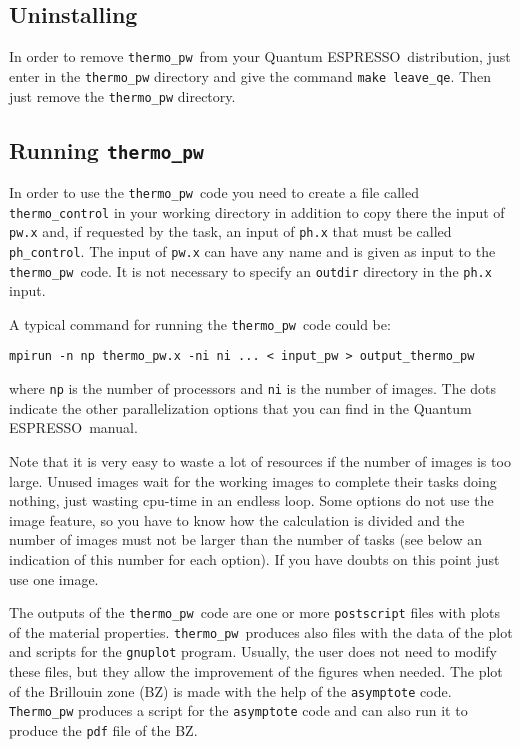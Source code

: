 \documentclass[12pt,a4paper]{article}
\def\qe{{\sc Quantum ESPRESSO}}
\def\thermo{\texttt{thermo\_pw}}
\begin{document}
\subsection{\color{web-blue}Uninstalling}

In order to remove \thermo\ from your \qe\ distribution, just enter in the
\texttt{thermo\_pw} directory and give the command \texttt{make leave\_qe}.
Then just remove the \texttt{thermo\_pw} directory. 

\subsection{\color{web-blue}Running \thermo}

In order to use the \thermo\ code you need to create a file called
\texttt{thermo\_control} in your working directory in addition to copy
there the input of \texttt{pw.x} and, if requested by the task, an
input of \texttt{ph.x} that must be called \texttt{ph\_control}.
The input of \texttt{pw.x} can have any name and is given as input to
the \thermo\ code. It is not necessary to specify an \texttt{outdir} 
directory in the \texttt{ph.x} input.

A typical command for running the \thermo\ code could be:
\begin{verbatim}
mpirun -n np thermo_pw.x -ni ni ... < input_pw > output_thermo_pw
\end{verbatim}
where \texttt{np} is the number of processors and \texttt{ni} is the number 
of images. The dots indicate the other parallelization options that
you can find in the \qe\ manual.

Note that it is very easy to waste a lot of resources if the number of 
images is too large. Unused images wait for the working images to complete
their tasks doing nothing, just wasting cpu-time in an endless loop. 
Some options 
do not use the image feature, so you have to know how the calculation 
is divided and the number of images must not
be larger than the number of tasks (see below an indication of this number
for each option). If you have doubts on this point just use one image.

The outputs of the \thermo\ code are one or more \texttt{postscript} files 
with plots of the material properties. \thermo\ produces also files with 
the data of 
the plot and scripts for the \texttt{gnuplot} program. 
Usually, the user does not need to modify these files, but they allow 
the improvement of the figures when needed.
The plot of the Brillouin zone (BZ) is made with the help of the 
\texttt{asymptote} code. \texttt{Thermo\_pw} produces a script 
for the \texttt{asymptote} code and can also run it to produce the \texttt{pdf}
file of the BZ. 
\end{document}
